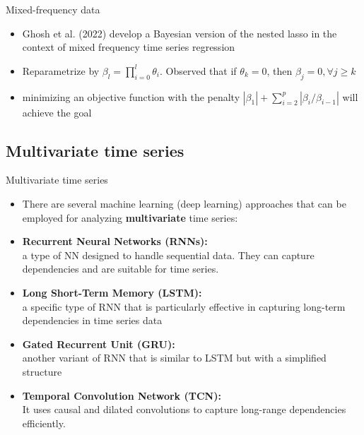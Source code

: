 \documentclass{beamer}
\begin{document}
\begin{frame}{Mixed-frequency data}
    \begin{itemize}
        \item Ghosh et al. (2022) develop a Bayesian version of the nested lasso in the context of mixed frequency time series regression
        \bigskip
        
        \item Reparametrize by $\beta_l = \prod_{i=0}^l \theta_i$. Observed that if $\theta_k=0$, then $\beta_j=0, \forall j \geq k$
        \bigskip
        
        \item minimizing an objective function with the penalty $|\beta_1| + \sum_{i=2}^p |\beta_i/\beta_{i-1}|$ will achieve the goal
    \end{itemize}
\end{frame}

\subsection{Multivariate time series}

\begin{frame}{Multivariate time series}
    \begin{itemize}
        \item There are several machine learning (deep learning) approaches that can be employed for analyzing \textbf{multivariate} time series:
        \medskip
        
        \item \textbf{Recurrent Neural Networks (RNNs):} \\
        a type of NN designed to handle sequential data. They can capture dependencies and are suitable for time series.
        
        \item \textbf{Long Short-Term Memory (LSTM):} \\
        a specific type of RNN that is particularly effective in capturing long-term dependencies in time series data
        
        \item \textbf{Gated Recurrent Unit (GRU):} \\
        another variant of RNN that is similar to LSTM but with a simplified structure

        \item \textbf{Temporal Convolution Network (TCN):}\\
        It uses causal and dilated convolutions to capture long-range dependencies efficiently.
    \end{itemize}
\end{frame}
\end{document}
